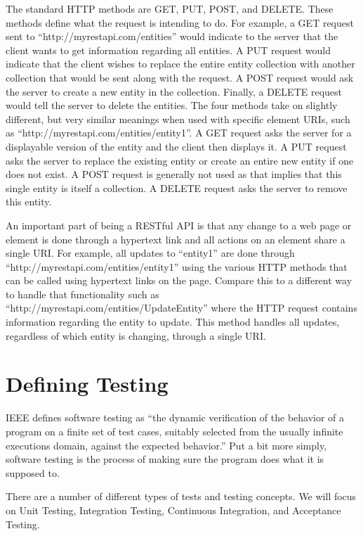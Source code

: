 \documentclass[12pt]{ucthesis}
\begin{document}
The standard HTTP methods are GET, PUT, POST, and DELETE. These methods define what the request is intending to do. For example, a GET request sent to ``http://myrestapi.com/entities'' would indicate to the server that the client wants to get information regarding all entities. A PUT request would indicate that the client wishes to replace the entire entity collection with another collection that would be sent along with the request. A POST request would ask the server to create a new entity in the collection. Finally, a DELETE request would tell the server to delete the entities. The four methods take on slightly different, but very similar meanings when used with specific element URIs, such as ``http://myrestapi.com/entities/entity1''. A GET request asks the server for a displayable version of the entity and the client then displays it. A PUT request asks the server to replace the existing entity or create an entire new entity if one does not exist. A POST request is generally not used as that implies that this single entity is itself a collection. A DELETE request asks the server to remove this entity.

An important part of being a RESTful API is that any change to a web page or element is done through a hypertext link and all actions on an element share a single URI. For example, all updates to ``entity1'' are done through ``http://myrestapi.com/entities/entity1'' using the various HTTP methods that can be called using hypertext links on the page. Compare this to a different way to handle that functionality such as ``http://myrestapi.com/entities/UpdateEntity'' where the HTTP request contains information regarding the entity to update. This method handles all updates, regardless of which entity is changing, through a single URI.

\section{Defining Testing}
IEEE defines software testing as ``the dynamic verification of the behavior of a program on a finite set of test cases, suitably selected from the usually infinite executions domain, against the expected behavior.'' \cite{TestingDefinition} Put a bit more simply, software testing is the process of making sure the program does what it is supposed to.

There are a number of different types of tests and testing concepts. We will focus on Unit Testing, Integration Testing, Continuous Integration, and Acceptance Testing.
\end{document}
